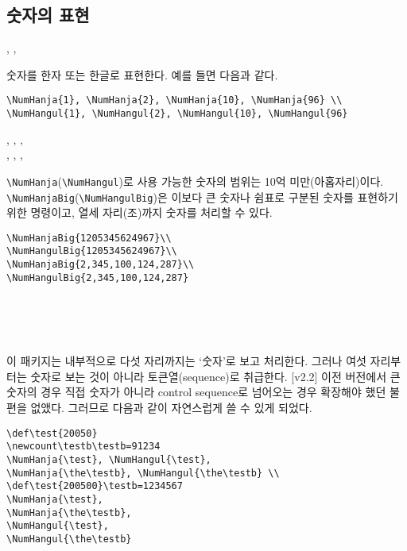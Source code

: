 \documentclass[b5paper,nanum]{oblivoir}
\def\cs#1{\texttt{\textbackslash #1}}
\begin{document}
\subsection{숫자의 표현}

\begin{boxedverbatim}
,    
, 
\end{boxedverbatim}

숫자를 한자 또는 한글로 표현한다.
예를 들면 다음과 같다.
\begin{verbatim}
\NumHanja{1}, \NumHanja{2}, \NumHanja{10}, \NumHanja{96} \\
\NumHangul{1}, \NumHangul{2}, \NumHangul{10}, \NumHangul{96}
\end{verbatim}
{
, , ,  \\
, , , 
}

\medskip

\cs{NumHanja}(\cs{NumHangul})로 사용 가능한 숫자의 범위는 10억 미만(아홉자리)이다. 
\cs{NumHanjaBig}(\cs{NumHangulBig})은 이보다 큰 숫자나 쉼표로 구분된 숫자를 표현하기 위한 명령이고, 
열세 자리(조)까지 숫자를 처리할 수 있다.

\begin{verbatim}
\NumHanjaBig{1205345624967}\\
\NumHangulBig{1205345624967}\\
\NumHanjaBig{2,345,100,124,287}\\
\NumHangulBig{2,345,100,124,287}
\end{verbatim}
\\
\\
\\

\medskip

이 패키지는 내부적으로 다섯 자리까지는 `숫자'로 보고 처리한다.
그러나 여섯 자리부터는 숫자로 보는 것이 아니라 토큰열(sequence)로 취급한다.
[v2.2] 이전 버전에서 큰 숫자의 경우 직접 숫자가 아니라 control sequence로
넘어오는 경우 확장해야 했던 불편을 없앴다. 그러므로 다음과 같이 자연스럽게 쓸 수 있게 되었다.
\begin{verbatim}
\def\test{20050}
\newcount\testb\testb=91234
\NumHanja{\test}, \NumHangul{\test},
\NumHanja{\the\testb}, \NumHangul{\the\testb} \\
\def\test{200500}\testb=1234567
\NumHanja{\test},
\NumHanja{\the\testb},
\NumHangul{\test},
\NumHangul{\the\testb}
\end{verbatim}
\end{document}
